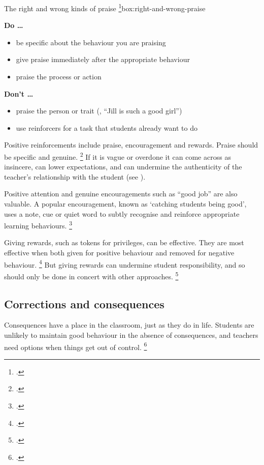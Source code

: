 \documentclass{grattan}
\begin{document}
\begin{verysmallbox}{The right and wrong kinds of praise%
    \footcites{Epstein2008ReducingBehaviorProblems}{Greenberg2014TrainingOurFuture}}{box:right-and-wrong-praise}

\textbf{Do \dots}

 \begin{itemize}
    \item be specific about the behaviour you are praising
    \item give praise immediately after the appropriate behaviour
    \item praise the process or action
\end{itemize}

\textbf{Don't \dots}
\begin{itemize}
    \item praise the person or trait (\eg, ``Jill is such a good girl'')
    \item use reinforcers for a task that students already want to do
\end{itemize}

\end{verysmallbox}

Positive reinforcements include praise, encouragement and rewards. Praise should be specific and genuine.%
    \footcite{Simonsen2008EvidenceBasedPractices}
If it is vague or overdone it can come across as insincere, can lower expectations, and can undermine the authenticity of the teacher's relationship with the student (see ).

Positive attention and genuine encouragements such as ``good job'' are also valuable. A popular encouragement, known as `catching students being good', uses a note, cue or quiet word to subtly recognise and reinforce appropriate learning behaviours.%
    \footcite{Marzano2005HandbookClassroomManagement}

Giving rewards, such as tokens for privileges, can be effective. They are most effective when both given for positive behaviour and removed for negative behaviour.%
    \footcite{Marzano2003ClassroomManagementWorks}
But giving rewards can undermine student responsibility, and so should only be done in concert with other approaches.%
    \footcite{Bear2015PreventiveClassroomBased}

\subsection{Corrections and consequences}\label{subsec:corrections-and-consequences}
Consequences have a place in the classroom, just as they do in life. Students are unlikely to maintain good behaviour in the absence of consequences, and teachers need options when things get out of control.%
    \footcite{LewisMontuoro2013SelfPredictedClassroom}
\end{document}
